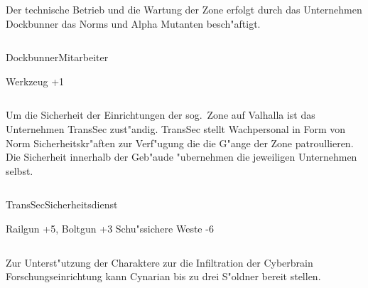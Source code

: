 
\begin{column}[l]{0.45}
    Der technische Betrieb und die Wartung der Zone erfolgt durch das Unternehmen Dockbunner das Norms und Alpha Mutanten 
    besch"aftigt.
\end{column}
\begin{column}[r]{0.45}
    \begin{nscsheet}[h]{Dockbunner\newline{}Mitarbeiter}
        \nscstats[ATT=2,AGG=2,EMP=3,KNO=5,HP=10]
        \nscruler
        \begin{nscinventory}
            \nscitem[Waffen] Werkzeug +1
        \end{nscinventory}
    \end{nscsheet}
\end{column}    


\begin{column}[l]{0.45}
    Um die Sicherheit der Einrichtungen der sog.~Zone auf Valhalla ist das Unternehmen TransSec zust"andig. TransSec stellt
    Wachpersonal in Form von Norm Sicherheitskr"aften zur Verf"ugung die die G"ange der Zone patroullieren. Die Sicherheit
    innerhalb der Geb"aude "ubernehmen die jeweiligen Unternehmen selbst.
\end{column}
\begin{column}[r]{0.45}
    \begin{nscsheet}[h]{TransSec\newline{}Sicherheitsdienst}
        \nscstats[ATT=3,AGG=3,EMP=2,KNO=4,HP=10]
        \nscruler
        \begin{nscinventory}
            \nscitem[Waffen] Railgun +5, Boltgun +3
            \nscitem[R"ustung] Schu"ssichere Weste -6           
        \end{nscinventory}
    \end{nscsheet}
\end{column}        


Zur Unterst"utzung der Charaktere zur die Infiltration der Cyberbrain Forschungseinrichtung kann Cynarian bis zu 
drei S"oldner bereit stellen.

